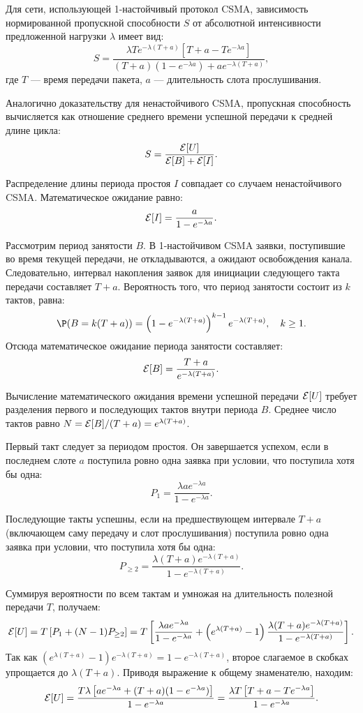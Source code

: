 \begin{statement}
    Для сети, использующей 1-настойчивый протокол CSMA, зависимость нормированной пропускной способности $S$ от абсолютной интенсивности предложенной нагрузки $\lambda$ имеет вид:
    $$ S = \frac{\lambda T e^{-\lambda(T+a)} [T + a - T e^{-\lambda a}]}{(T+a)(1 - e^{-\lambda a}) + a e^{-\lambda(T+a)}}, $$
    где $T$ — время передачи пакета, $a$ — длительность слота прослушивания.
\end{statement}
\begin{sproof}
    Аналогично доказательству для ненастойчивого CSMA, пропускная способность вычисляется как отношение среднего времени успешной передачи к средней длине цикла:
    $$ S = \frac{\mathcal{E}[U]}{\mathcal{E}[B] + \mathcal{E}[I]}. $$
    
    Распределение длины периода простоя $I$ совпадает со случаем ненастойчивого CSMA. Математическое ожидание равно:
    $$ \mathcal{E}[I] = \frac{a}{1 - e^{-\lambda a}}. $$

    Рассмотрим период занятости $B$. В 1-настойчивом CSMA заявки, поступившие во время текущей передачи, не откладываются, а ожидают освобождения канала. Следовательно, интервал накопления заявок для инициации следующего такта передачи составляет $T+a$. Вероятность того, что период занятости состоит из $k$ тактов, равна:
    $$ \P(B = k(T + a)) = \left(1 - e^{-\lambda(T+a)}\right)^{k-1} e^{-\lambda(T+a)}, \quad k \ge 1. $$
    Отсюда математическое ожидание периода занятости составляет:
    $$ \mathcal{E}[B] = \frac{T+a}{e^{-\lambda(T+a)}}. $$

    Вычисление математического ожидания времени успешной передачи $\mathcal{E}[U]$ требует разделения первого и последующих тактов внутри периода $B$. Среднее число тактов равно $N = \mathcal{E}[B]/(T+a) = e^{\lambda(T+a)}$. 
    
    Первый такт следует за периодом простоя. Он завершается успехом, если в последнем слоте $a$ поступила ровно одна заявка при условии, что поступила хотя бы одна:
    $$ P_1 = \frac{\lambda a e^{-\lambda a}}{1 - e^{-\lambda a}}. $$
    
    Последующие такты успешны, если на предшествующем интервале $T+a$ (включающем саму передачу и слот прослушивания) поступила ровно одна заявка при условии, что поступила хотя бы одна:
    $$ P_{\ge 2} = \frac{\lambda(T+a) e^{-\lambda(T+a)}}{1 - e^{-\lambda(T+a)}}. $$
    
    Суммируя вероятности по всем тактам и умножая на длительность полезной передачи $T$, получаем:
    $$ \mathcal{E}[U] = T \left[ P_1 + (N - 1) P_{\ge 2} \right] = T \left[ \frac{\lambda a e^{-\lambda a}}{1 - e^{-\lambda a}} + \left(e^{\lambda(T+a)} - 1\right) \frac{\lambda(T+a) e^{-\lambda(T+a)}}{1 - e^{-\lambda(T+a)}} \right]. $$
    Так как $\left(e^{\lambda(T+a)} - 1\right) e^{-\lambda(T+a)} = 1 - e^{-\lambda(T+a)}$, второе слагаемое в скобках упрощается до $\lambda(T+a)$. Приводя выражение к общему знаменателю, находим:
    $$ \mathcal{E}[U] = \frac{T \lambda \left[ a e^{-\lambda a} + (T+a)(1 - e^{-\lambda a}) \right]}{1 - e^{-\lambda a}} = \frac{\lambda T \left[ T + a - T e^{-\lambda a} \right]}{1 - e^{-\lambda a}}. $$


\end{sproof}
